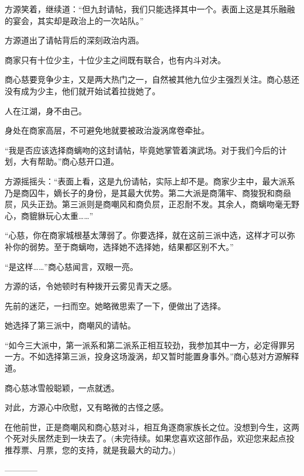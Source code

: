 \begin{this_body}
方源笑着，继续道：“但九封请帖，我们只能选择其中一个。表面上这是其乐融融的宴会，其实却是政治上的一次站队。”

方源道出了请帖背后的深刻政治内涵。

商家只有十位少主，十位少主之间既有联合，也有内斗对决。

商心慈要竞争少主，又是两大热门之一，自然被其他九位少主强烈关注。商心慈还没有成为少主，他们就开始试着拉拢她了。

人在江湖，身不由己。

身处在商家高层，不可避免地就要被政治漩涡席卷牵扯。

“我是否应该选择商螭吻的这封请帖，毕竟她掌管着演武场。对于我们今后的计划，大有帮助。”商心慈开口道。

方源摇摇头：“表面上看，这是九份请帖，实际上却不是。商家少主中，最大派系乃是商囚牛，嫡长子的身份，是其最大优势。第二大派是商蒲牢、商狻猊和商赑屃，风头正劲。第三派则是商嘲风和商负屃，正忍耐不发。其余人，商螭吻毫无野心，商貔貅玩心太重……”

“心慈，你在商家城根基太薄弱了。你要选择，就在这前三派中选，这样才可以弥补你的弱势。至于商螭吻，选择她不选择她，结果都区别不大。”

“是这样……”商心慈闻言，双眼一亮。

方源的话，令她顿时有种拨开云雾见青天之感。

先前的迷茫，一扫而空。她略微思索了一下，便做出了选择。

她选择了第三派中，商嘲风的请帖。

“如今三大派中，第一派系和第二派系正相互较劲，我参加其中一方，必定得罪另一方。不如选择第三派，投身这场漩涡，却又暂时能置身事外。”商心慈对方源解释道。

商心慈冰雪般聪颖，一点就透。

对此，方源心中欣慰，又有略微的古怪之感。

在他前世，正是商嘲风和商心慈对斗，相互角逐商家族长之位。没想到今生，这两个死对头居然走到一块去了。(未完待续。如果您喜欢这部作品，欢迎您来起点投推荐票、月票，您的支持，就是我最大的动力。)

------------

\end{this_body}

